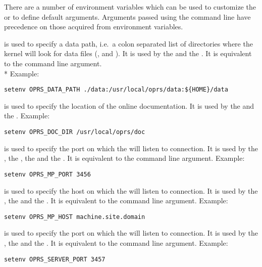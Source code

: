 There are a number of environment variables which can be used to customize the
\XPK{} or to define default arguments. Arguments passed using the command line
have precedence on those acquired from environment variables.

\begin{description}

\item[\code{OPRS\_DATA\_PATH}] is used  to specify a data path, i.e.\ a colon separated
list of directories where the kernel will look for data files (,
 and ). It is used by the \CPK{} and the \XPK{}. It is
equivalent to the  command line argument.\\*
Example:
\begin{verbatim}
setenv OPRS_DATA_PATH ./data:/usr/local/oprs/data:${HOME}/data
\end{verbatim}

\item[\code{OPRS\_DOC\_DIR}] is used  to specify the location of the online \COPRSDE{}
documentation. It is used by the \XPK{} and the \OPE{}.
Example:
\begin{verbatim}
setenv OPRS_DOC_DIR /usr/local/oprs/doc
\end{verbatim}

\item[\code{OPRS\_MP\_PORT}] is used  to specify the port on which the \MPA{} will listen
to connection. It is used by the \CPK{}, the \XPK{}, the \OPRSS{} and the
\MPA{}. It is equivalent to the  command line argument.
Example:
\begin{verbatim}
setenv OPRS_MP_PORT 3456
\end{verbatim}

\item[\code{OPRS\_MP\_HOST}] is used  to specify the host on which the \MPA{} will
listen to connection. It is used by the \CPK{}, the \XPK{} and the
\OPRSS{}.  It is equivalent to the  command line argument.
Example:
\begin{verbatim}
setenv OPRS_MP_HOST machine.site.domain
\end{verbatim}

\item[\code{OPRS\_SERVER\_PORT}] is used  to specify the port on which the
\OPRSS{} will listen to connection. It is used by the \CPK{}, the \XPK{}
and the \OPRSS{}.  It is equivalent to the  command line argument.
Example:
\begin{verbatim}
setenv OPRS_SERVER_PORT 3457
\end{verbatim}


\end{description}
